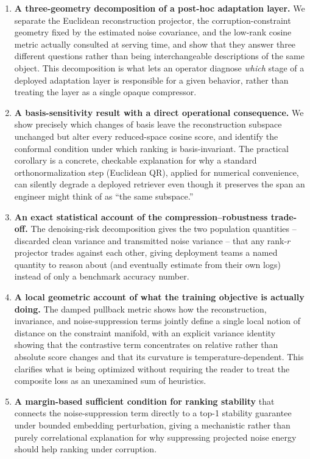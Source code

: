 \begin{enumerate}[leftmargin=1.6em]
 \item \textbf{A three-geometry decomposition of a post-hoc adaptation
 layer.} We separate the Euclidean reconstruction projector, the
 corruption-constraint geometry fixed by the estimated noise covariance,
 and the low-rank cosine metric actually consulted at serving time, and
 show that they answer three different questions rather than being
 interchangeable descriptions of the same object. This decomposition is
 what lets an operator diagnose \emph{which} stage of a deployed adaptation
 layer is responsible for a given behavior, rather than treating the layer
 as a single opaque compressor.

 \item \textbf{A basis-sensitivity result with a direct operational
 consequence.} We show precisely which changes of basis leave the
 reconstruction subspace unchanged but alter every reduced-space cosine
 score, and identify the conformal condition under which ranking is
 basis-invariant. The practical corollary is a concrete, checkable
 explanation for why a standard orthonormalization step (Euclidean QR),
 applied for numerical convenience, can silently degrade a deployed
 retriever even though it preserves the span an engineer might think of as
 ``the same subspace.''

 \item \textbf{An exact statistical account of the compression--robustness
 trade-off.} The denoising-risk decomposition gives the two population
 quantities -- discarded clean variance and transmitted noise variance --
 that any rank-$r$ projector trades against each other, giving deployment
 teams a named quantity to reason about (and eventually estimate from their
 own logs) instead of only a benchmark accuracy number.

 \item \textbf{A local geometric account of what the training objective is
 actually doing.} The damped pullback metric shows how the reconstruction,
 invariance, and noise-suppression terms jointly define a single local
 notion of distance on the constraint manifold, with an explicit variance
 identity showing that the contrastive term concentrates on relative
 rather than absolute score changes and that its curvature is
 temperature-dependent. This clarifies what is being optimized without
 requiring the reader to treat the composite loss as an unexamined sum of
 heuristics.

 \item \textbf{A margin-based sufficient condition for ranking stability}
 that connects the noise-suppression term directly to a top-1 stability
 guarantee under bounded embedding perturbation, giving a mechanistic
 rather than purely correlational explanation for why suppressing
 projected noise energy should help ranking under corruption.


\end{enumerate}
